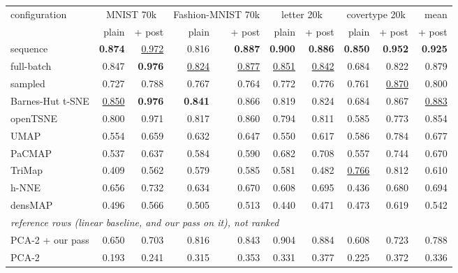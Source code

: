 \begin{tabular}{lrrrrrrrrr}
\toprule
configuration & \multicolumn{2}{c}{MNIST 70k} & \multicolumn{2}{c}{Fashion-MNIST 70k} & \multicolumn{2}{c}{letter 20k} & \multicolumn{2}{c}{covertype 20k} & mean \\
 & plain & + post & plain & + post & plain & + post & plain & + post & + post \\
\midrule
\magnet{} sequence & \textbf{0.874} & \underline{0.972} & 0.816 & \textbf{0.887} & \textbf{0.900} & \textbf{0.886} & \textbf{0.850} & \textbf{0.952} & \textbf{0.925} \\
\magnet{} full-batch & 0.847 & \textbf{0.976} & \underline{0.824} & \underline{0.877} & \underline{0.851} & \underline{0.842} & 0.684 & 0.822 & 0.879 \\
\magnet{} sampled & 0.727 & 0.788 & 0.767 & 0.764 & 0.772 & 0.776 & 0.761 & \underline{0.870} & 0.800 \\
Barnes-Hut t-SNE & \underline{0.850} & \textbf{0.976} & \textbf{0.841} & 0.866 & 0.819 & 0.824 & 0.684 & 0.867 & \underline{0.883} \\
openTSNE & 0.800 & 0.971 & 0.817 & 0.860 & 0.794 & 0.811 & 0.585 & 0.773 & 0.854 \\
UMAP & 0.554 & 0.659 & 0.632 & 0.647 & 0.550 & 0.617 & 0.586 & 0.784 & 0.677 \\
PaCMAP & 0.537 & 0.637 & 0.584 & 0.590 & 0.682 & 0.708 & 0.557 & 0.744 & 0.670 \\
TriMap & 0.409 & 0.562 & 0.579 & 0.585 & 0.581 & 0.482 & \underline{0.766} & 0.812 & 0.610 \\
h-NNE & 0.656 & 0.732 & 0.634 & 0.670 & 0.608 & 0.695 & 0.436 & 0.680 & 0.694 \\
densMAP & 0.496 & 0.566 & 0.505 & 0.513 & 0.440 & 0.471 & 0.473 & 0.619 & 0.542 \\
\midrule
\multicolumn{10}{l}{\emph{reference rows (linear baseline, and our pass on it), not ranked}} \\
PCA-2 + our pass & 0.650 & 0.703 & 0.816 & 0.843 & 0.904 & 0.884 & 0.608 & 0.723 & 0.788 \\
PCA-2 & 0.193 & 0.241 & 0.315 & 0.353 & 0.331 & 0.377 & 0.225 & 0.372 & 0.336 \\
\bottomrule
\end{tabular}
